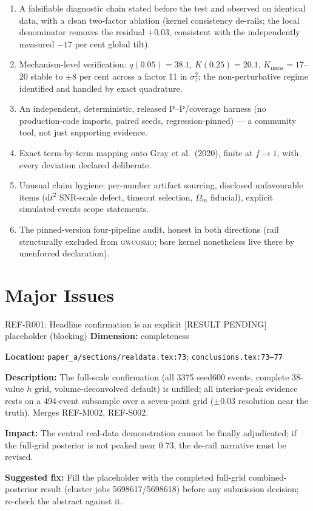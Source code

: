 \documentclass[11pt]{article}
\begin{document}
\begin{StrengthBox}
\begin{enumerate}
  \item A falsifiable diagnostic chain stated before the test and observed on identical data, with a clean two-factor ablation (kernel consistency de-rails; the local denominator removes the residual $+0.03$, consistent with the independently measured $-17$ per cent global tilt).
  \item Mechanism-level verification: $q(0.05)=38.1$, $K(0.25)=20.1$, $K_\mathrm{meas}=17$--$20$ stable to $\pm 8$ per cent across a factor 11 in $\sigma_z^2$; the non-perturbative regime identified and handled by exact quadrature.
  \item An independent, deterministic, released P--P/coverage harness (no production-code imports, paired seeds, regression-pinned) --- a community tool, not just supporting evidence.
  \item Exact term-by-term mapping onto Gray et al.\ (2020), finite at $f \to 1$, with every deviation declared deliberate.
  \item Unusual claim hygiene: per-number artifact sourcing, disclosed unfavourable items (d$t^2$ SNR-scale defect, timeout selection, $\Omega_m$ fiducial), explicit simulated-events scope statements.
  \item The pinned-version four-pipeline audit, honest in both directions (rail structurally excluded from \textsc{gwcosmo}; bare kernel nonetheless live there by unenforced declaration).
\end{enumerate}
\end{StrengthBox}

\section*{Major Issues}

\begin{MajorIssueBox}{REF-R001: Headline confirmation is an explicit [RESULT PENDING] placeholder (blocking)}
\textbf{Dimension:} completeness

\textbf{Location:} \texttt{paper\_a/sections/realdata.tex:73}; \texttt{conclusions.tex:73--77}

\textbf{Description:} The full-scale confirmation (all 3375 seed600 events, complete 38-value $h$ grid, volume-deconvolved default) is unfilled; all interior-peak evidence rests on a 494-event subsample over a seven-point grid ($\pm 0.03$ resolution near the truth). Merges REF-M002, REF-S002.

\textbf{Impact:} The central real-data demonstration cannot be finally adjudicated; if the full-grid posterior is not peaked near 0.73, the de-rail narrative must be revised.

\textbf{Suggested fix:} Fill the placeholder with the completed full-grid combined-posterior result (cluster jobs 5698617/5698618) before any submission decision; re-check the abstract against it.
\end{MajorIssueBox}
\end{document}
